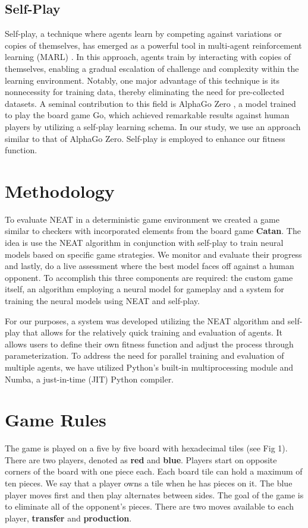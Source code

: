 \documentclass[letterpaper, 12pt]{article}
\begin{document}
\subsection*{Self-Play}
Self-play, a technique where agents learn by competing against variations or copies of
themselves, has emerged as a powerful tool in multi-agent reinforcement learning (MARL)
\cite{5392560}. In this approach, agents train by interacting with copies of themselves,
enabling a gradual escalation of challenge and complexity within the learning
environment. Notably, one major advantage of this technique is its nonnecessity for
training data, thereby eliminating the need for pre-collected datasets. A seminal
contribution to this field is AlphaGo Zero \cite{silver2017mastering}, a model trained
to play the board game Go, which achieved remarkable results against human players by
utilizing a self-play learning schema. In our study, we use an approach similar to that
of AlphaGo Zero. Self-play is employed to enhance our fitness function.

\section*{Methodology}
To evaluate NEAT in a deterministic game environment we created a game similar to
checkers with incorporated elements from the board game \textbf{Catan}. The idea is
use the NEAT algorithm in conjunction with self-play to train neural models based on
specific game strategies. We monitor and evaluate their progress and lastly, do a live
assessment where the best model faces off against a human opponent. To accomplish this
three components are required: the custom game itself, an algorithm employing a neural
model for gameplay and a system for training the neural models using NEAT and self-play.

For our purposes, a system was developed utilizing the NEAT algorithm and self-play that
allows for the relatively quick training and evaluation of agents. It allows users to
define their own fitness function and adjust the process through parameterization. To
address the need for parallel training and evaluation of multiple agents, we have
utilized Python's built-in multiprocessing module and Numba, a just-in-time (JIT) Python
compiler.

\section*{Game Rules}
The game is played on a five by five board with hexadecimal tiles (see Fig 1). There are
two players, denoted as \textbf{red} and \textbf{blue}. Players start on opposite
corners of the board with one piece each. Each board tile can hold a maximum of ten
pieces. We say that a player owns a tile when he has pieces on it. The blue player moves
first and then play alternates between sides. The goal of the game is to eliminate all
of the opponent's pieces. There are two moves available to each player, \textbf{transfer}
and \textbf{production}.
\end{document}
